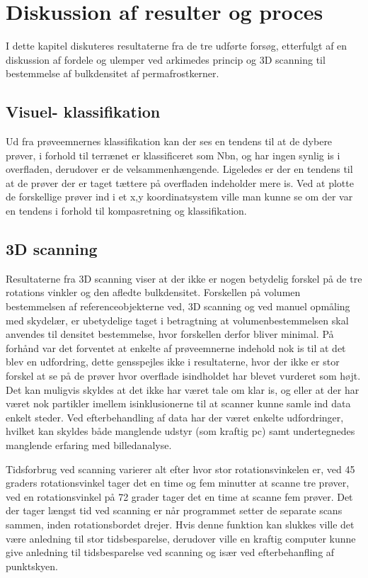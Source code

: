 \chapter{Diskussion af resulter og proces}
I dette kapitel diskuteres resultaterne fra de tre udførte forsøg, etterfulgt af en diskussion af fordele og ulemper ved arkimedes princip og 3D scanning til bestemmelse af bulkdensitet af permafrostkerner.

\section{Visuel- klassifikation}
Ud fra prøveemnernes klassifikation kan der ses en tendens til at de dybere prøver, i forhold til terrænet er klassificeret som Nbn, og har ingen synlig is i overfladen, derudover er de velsammenhængende. Ligeledes er der en tendens til at de prøver der er taget tættere på overfladen indeholder mere is. Ved at plotte de forskellige prøver ind i et x,y koordinatsystem ville man kunne se om der var en tendens i forhold til kompasretning og klassifikation. 

\section{3D scanning}
Resultaterne fra 3D scanning viser at der ikke er nogen betydelig forskel på de tre rotations vinkler og den afledte bulkdensitet. Forskellen på volumen bestemmelsen af referenceobjekterne ved, 3D scanning og ved manuel opmåling med skydelær, er ubetydelige taget i betragtning at volumenbestemmelsen skal anvendes til densitet bestemmelse, hvor forskellen derfor bliver minimal. 
På forhånd var det forventet at enkelte af prøveemnerne indehold nok is til at det blev en udfordring, dette gensspejles ikke i resultaterne, hvor der ikke er stor forskel at se på de prøver hvor overflade isindholdet har blevet vurderet som højt. Det kan muligvis skyldes at det ikke har været tale om klar is, og eller at der har været nok partikler imellem isinklusionerne til at scanner kunne samle ind data enkelt steder.
Ved efterbehandling af data har der været enkelte udfordringer, hvilket kan skyldes både manglende udstyr (som kraftig pc) samt undertegnedes manglende erfaring med billedanalyse. 

Tidsforbrug ved scanning varierer alt efter hvor stor rotationsvinkelen er, ved 45 graders rotationsvinkel tager det en time og fem minutter at scanne tre prøver, ved en rotationsvinkel på 72 grader tager det en time at scanne fem prøver. Det der tager længst tid ved scanning er når programmet setter de separate scans sammen, inden rotationsbordet drejer. Hvis denne funktion kan slukkes ville det være anledning til stor tidsbesparelse, derudover ville en kraftig computer kunne give anledning til tidsbesparelse ved scanning og især ved efterbehanfling af punktskyen. 

